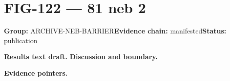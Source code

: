 \clearpage
\section{FIG-122 --- 81 neb 2}
\label{figpage:fig-122}
\textbf{Group:} ARCHIVE-NEB-BARRIER\quad \textbf{Evidence chain:} manifested\quad \textbf{Status:} publication

\textbf{Results text draft.} 
\textbf{Discussion and boundary.} 


\textbf{Evidence pointers.}



\vfill

